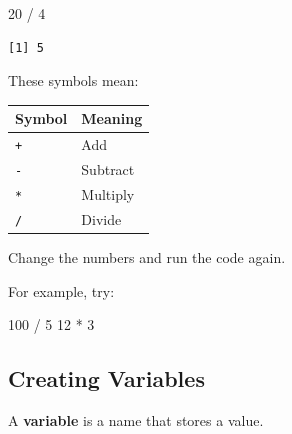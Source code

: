 \documentclass[
  letterpaper,
  DIV=11,
  numbers=noendperiod]{scrartcl}
\newenvironment{Shaded}{\begin{snugshade}}{\end{snugshade}}
\newcommand{\DecValTok}[1]{\textcolor[rgb]{0.68,0.00,0.00}{#1}}
\newcommand{\SpecialCharTok}[1]{\textcolor[rgb]{0.37,0.37,0.37}{#1}}
\newcounter{none} %
\begin{document}
\begin{Shaded}
\begin{Highlighting}[]
\DecValTok{20} \SpecialCharTok{/} \DecValTok{4}
\end{Highlighting}
\end{Shaded}

\begin{verbatim}
[1] 5
\end{verbatim}

These symbols mean:

{\def\LTcaptype{none} %
\begin{longtable}[]{@{}ll@{}}
\toprule\noalign{}
Symbol & Meaning \\
\midrule\noalign{}
\endhead
\bottomrule\noalign{}
\endlastfoot
\texttt{+} & Add \\
\texttt{-} & Subtract \\
\texttt{*} & Multiply \\
\texttt{/} & Divide \\
\end{longtable}
}

\begin{tcolorbox}[enhanced jigsaw, arc=.35mm, bottomrule=.15mm, bottomtitle=1mm, breakable, colback=white, colbacktitle=quarto-callout-note-color!10!white, colframe=quarto-callout-note-color-frame, coltitle=black, left=2mm, leftrule=.75mm, opacityback=0, opacitybacktitle=0.6, rightrule=.15mm, title=\textcolor{quarto-callout-note-color}{\faInfo}\hspace{0.5em}{Try It Yourself}, titlerule=0mm, toprule=.15mm, toptitle=1mm]

Change the numbers and run the code again.

For example, try:

\begin{Shaded}
\begin{Highlighting}[]
\DecValTok{100} \SpecialCharTok{/} \DecValTok{5}
\DecValTok{12} \SpecialCharTok{*} \DecValTok{3}
\end{Highlighting}
\end{Shaded}

\end{tcolorbox}

\subsection{Creating Variables}\label{creating-variables}

A \textbf{variable} is a name that stores a value.
\end{document}
